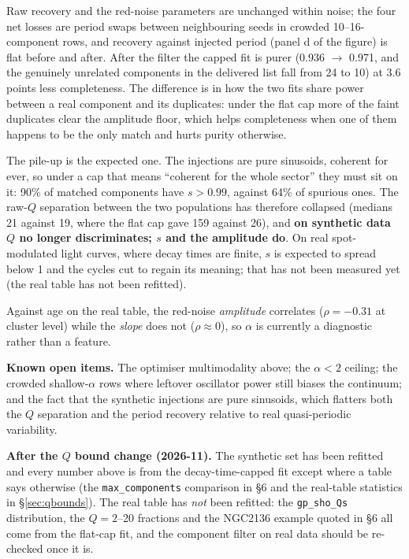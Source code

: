 \documentclass[11pt]{article}
\newcommand{\code}[1]{\texttt{#1}}
\begin{document}
Raw recovery and the red-noise parameters are unchanged within noise; the four net losses
are period swaps between neighbouring seeds in crowded 10--16-component rows, and recovery
against injected period (panel d of the figure) is flat before and after. After the filter
the capped fit is purer (0.936 $\to$ 0.971, and the genuinely unrelated components in the
delivered list fall from 24 to 10) at 3.6 points less completeness. The difference is in
how the two fits share power between a real component and its duplicates: under the flat
cap more of the faint duplicates clear the amplitude floor, which helps completeness when
one of them happens to be the only match and hurts purity otherwise.

The pile-up is the expected one. The injections are pure sinusoids, coherent for ever, so
under a cap that means ``coherent for the whole sector'' they must sit on it: 90\% of
matched components have $s > 0.99$, against 64\% of spurious ones. The raw-$Q$ separation
between the two populations has therefore collapsed (medians 21 against 19, where the flat
cap gave 159 against 26), and \textbf{on synthetic data $Q$ no longer discriminates; $s$ and
the amplitude do}. On real spot-modulated light curves, where decay times are finite, $s$
is expected to spread below 1 and the cycles cut to regain its meaning; that has not been
measured yet (the real table has not been refitted).

Against age on the real table, the red-noise \emph{amplitude} correlates
($\rho = -0.31$ at cluster level) while the \emph{slope} does not ($\rho \approx 0$), so
$\alpha$ is currently a diagnostic rather than a feature.

\textbf{Known open items.} The optimiser multimodality above; the $\alpha < 2$ ceiling; the
crowded shallow-$\alpha$ rows where leftover oscillator power still biases the continuum; and
the fact that the synthetic injections are pure sinusoids, which flatters both the $Q$
separation and the period recovery relative to real quasi-periodic variability.

\textbf{After the $Q$ bound change (2026-11).} The synthetic set has been refitted and
every number above is from the decay-time-capped fit except where a table says otherwise
(the \code{max\_components} comparison in \S6 and the real-table statistics in
\S\ref{sec:qbounds}). The real table has \emph{not} been refitted: the
\code{gp\_sho\_Qs} distribution, the $Q = 2$--20 fractions and the NGC2136 example quoted
in \S6 all come from the flat-cap fit, and the component filter on real data should be
re-checked once it is.
\end{document}
